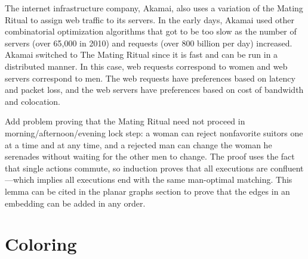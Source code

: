 The internet infrastructure company, Akamai, also uses a variation of
the Mating Ritual to assign web traffic to its servers.  In the early
days, Akamai used other combinatorial optimization algorithms that got
to be too slow as the number of servers (over 65,000 in 2010) and
requests (over 800 billion per day) increased.  Akamai switched to The
Mating Ritual since it is fast and can be run in a distributed manner.
In this case, web requests correspond to women and web servers
correspond to men.  The web requests have preferences based on latency
and packet loss, and the web servers have preferences based on cost of
bandwidth and colocation.

\begin{problems}
\practiceproblems



\classproblems



\homeworkproblems




\begin{problem}
\begin{editingnotes}
Add problem proving that the Mating Ritual need not proceed in
morning/afternoon/evening lock step: a woman can reject nonfavorite
suitors one at a time and at any time, and a rejected man can change
the woman he serenades without waiting for the other men to change.
The proof uses the fact that single actions commute, so induction
proves that all executions are confluent---which implies all
executions end with the same man-optimal matching.  This lemma can be
cited in the planar graphs section to prove that the edges in an
embedding can be added in any order.
\end{editingnotes}
\end{problem}

\end{problems}

\section{Coloring}\label{sec:coloring}

